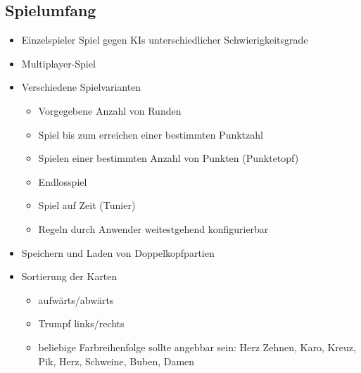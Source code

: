 \documentclass[12pt,a4paper]{article}
\begin{document}
\subsection{Spielumfang}
\begin{itemize}
\item Einzelspieler Spiel gegen KIs unterschiedlicher Schwierigkeitsgrade
\item Multiplayer-Spiel
\item Verschiedene Spielvarianten
\begin{itemize}
\item Vorgegebene Anzahl von Runden
\item Spiel bis zum erreichen einer bestimmten Punktzahl
\item Spielen einer bestimmten Anzahl von Punkten (Punktetopf)
\item Endlosspiel
\item Spiel auf Zeit (Tunier)
\item Regeln durch Anwender weitestgehend konfigurierbar
\end{itemize}
\item Speichern und Laden von Doppelkopfpartien
\item Sortierung der Karten
\begin{itemize}
\item aufwärts/abwärts
\item Trumpf links/rechts
\item beliebige Farbreihenfolge sollte angebbar sein: Herz Zehnen, Karo, Kreuz, Pik, Herz, Schweine, Buben, Damen
\end{itemize}
\end{itemize}
\end{document}
